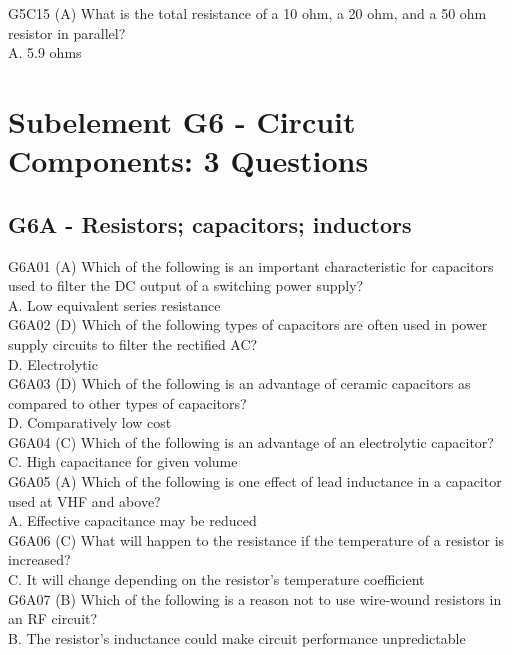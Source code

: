 \documentclass[12pt,letterpaper]{report}
\begin{document}
G5C15 (A) What is the total resistance of a 10 ohm, a 20 ohm, and a 50 ohm resistor in parallel?\\
A. 5.9 ohms\\

\chapter{Subelement G6 - Circuit Components: 3 Questions}
\section{G6A - Resistors; capacitors; inductors}

G6A01 (A) Which of the following is an important characteristic for capacitors used to filter the DC output of a switching power supply?\\
A. Low equivalent series resistance\\

G6A02 (D) Which of the following types of capacitors are often used in power supply circuits to filter the rectified AC?\\
D. Electrolytic\\

G6A03 (D) Which of the following is an advantage of ceramic capacitors as compared to other types of capacitors?\\
D. Comparatively low cost\\

G6A04 (C) Which of the following is an advantage of an electrolytic capacitor?\\
C. High capacitance for given volume\\

G6A05 (A) Which of the following is one effect of lead inductance in a capacitor used at VHF and above?\\
A. Effective capacitance may be reduced\\

G6A06 (C) What will happen to the resistance if the temperature of a resistor is increased?\\
C. It will change depending on the resistor's temperature coefficient\\

G6A07 (B) Which of the following is a reason not to use wire-wound resistors in an RF circuit?\\
B. The resistor's inductance could make circuit performance unpredictable\\
\end{document}
